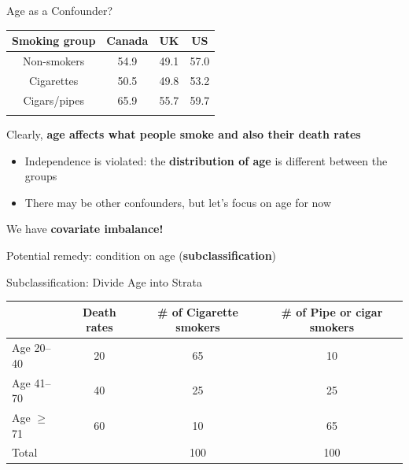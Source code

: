 \documentclass[
  ignorenonframetext,
  aspectratio=169, handout]{beamer}
\providecommand{\tightlist}{%
  \setlength{\itemsep}{0pt}\setlength{\parskip}{0pt}}
\newcommand{\brf}[1]{\textcolor{brickred}{\textbf{#1}}}
\begin{document}
\begin{frame}{Age as a Confounder?}
\protect\hypertarget{age-as-a-confounder}{}
\begin{longtable}[]{@{}cccc@{}}
\toprule\noalign{}
Smoking group & Canada & UK & US \\
\midrule\noalign{}
\endhead
Non-smokers & 54.9 & 49.1 & 57.0 \\
Cigarettes & 50.5 & 49.8 & 53.2 \\
Cigars/pipes & 65.9 & 55.7 & 59.7 \\
\bottomrule\noalign{}
\end{longtable}

Clearly, \brf{age affects what people smoke and also their death rates}

\begin{itemize}
\tightlist
\item
  Independence is violated: the \textbf{distribution of age} is
  different between the groups
\item
  There may be other confounders, but let's focus on age for now
\end{itemize}

\vfill

We have \brf{covariate imbalance!}

\vfill

Potential remedy: condition on age (\brf{subclassification})
\end{frame}

\begin{frame}{Subclassification: Divide Age into Strata}
\protect\hypertarget{subclassification-divide-age-into-strata}{}
\begin{center}
\begin{tabular}{lccc}
\hline
                & Death rates & \# of Cigarette smokers & \# of Pipe or cigar smokers \\ \hline
Age 20–40       & 20          & 65                       & 10                          \\
Age 41–70       & 40          & 25                       & 25                          \\
Age $\geq$ 71   & 60          & 10                       & 65                          \\
Total           &             & 100                      & 100                         \\ \hline
\end{tabular}
\end{center}
\end{frame}
\end{document}
